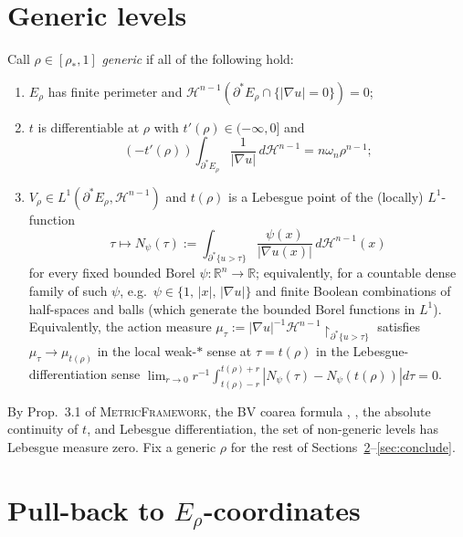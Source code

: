 \documentclass[11pt]{article}
\theoremstyle{definition}
\newcommand{\R}{\mathbb{R}}
\newcommand{\rstar}{\rho_{*}}
\newcommand{\Hn}{\mathcal H^{n-1}}
\begin{document}
\section{Generic levels}\label{sec:generic}

Call $\rho\in[\rstar,1]$ \emph{generic} if all of the following hold:
\begin{enumerate}[label=(\roman*)]
\item $E_\rho$ has finite perimeter and
$\Hn(\partial^*E_\rho\cap\{|\nabla u|=0\})=0$;
\item $t$ is differentiable at $\rho$ with $t'(\rho)\in(-\infty,0]$ and
\begin{equation}\label{eq:coarea-rho}
   (-t'(\rho))\int_{\partial^*E_\rho}\frac{1}{|\nabla u|}\,d\Hn
   =n\omega_n\rho^{n-1};
\end{equation}
\item $V_\rho\in L^1(\partial^*E_\rho,\Hn)$ and $t(\rho)$ is a Lebesgue
point of the (locally) $L^1$-function
\[
   \tau\longmapsto
   N_\psi(\tau):=\int_{\partial^*\{u>\tau\}}\frac{\psi(x)}{|\nabla u(x)|}\,d\Hn(x)
\]
for every fixed bounded Borel $\psi:\R^n\to\R$; equivalently, for a
countable dense family of such $\psi$, e.g.\ $\psi\in\{1,\,|x|,\,|\nabla u|\}$
and finite Boolean combinations of half-spaces and balls (which generate
the bounded Borel functions in $L^1$). Equivalently, the action measure
$\mu_\tau:=|\nabla u|^{-1}\Hn\!\!\restriction_{\partial^*\{u>\tau\}}$
satisfies $\mu_\tau\to\mu_{t(\rho)}$ in the local weak-$*$ sense at
$\tau=t(\rho)$ in the Lebesgue-differentiation sense $\lim_{r\to0}
r^{-1}\int_{t(\rho)-r}^{t(\rho)+r}|N_\psi(\tau)-N_\psi(t(\rho))|d\tau=0$.
\end{enumerate}
By Prop.~3.1 of \textsc{MetricFramework}, the BV coarea formula
\cite[Thm.~13.1]{Maggi2012}, \cite[Thm.~3.40]{AFP2000}, the absolute
continuity of $t$, and Lebesgue differentiation, the set of non-generic
levels has Lebesgue measure zero. Fix a generic $\rho$ for the rest of
Sections~\ref{sec:competitor}--\ref{sec:conclude}.

\section{Pull-back to $E_\rho$-coordinates}\label{sec:competitor}
\end{document}
